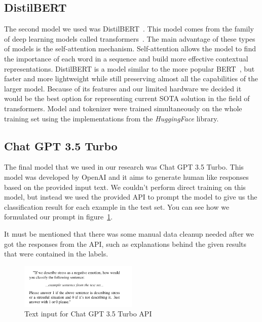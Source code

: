 \documentclass[10pt, a4paper]{article}
\begin{document}
\subsection{DistilBERT}
The second model we used was DistilBERT~\citep{sanh2020distilbert}.
This model comes from the family of deep learning models called transformers~\citep{vaswani2017attention}.
The main advantage of these types of models is the self-attention mechanism.
Self-attention allows the model to find the importance of each word in a sequence and build more effective contextual representations.
\hfill \break
\hfill \break
DistilBERT is a model similar to the more popular BERT~\citep{devlin2019bert}, but faster and more lightweight while still preserving almost all the capabilities of the larger model.
Because of its features and our limited hardware we decided it would be the best option for representing current SOTA solution in the field of transformers.
Model and tokenizer were trained simultaneously on the whole training set using the implementations from the \textit{HuggingFace} library.





\subsection{Chat GPT 3.5 Turbo}
The final model that we used in our research was Chat GPT 3.5 Turbo.
This model was developed by OpenAI and it aims to generate human like responses based on the provided input text.
We couldn't perform direct training on this model, but instead we used the provided API to prompt the model to give us the classification result for each example in the test set.
You can see how we formulated our prompt in figure~\ref{fig:chat-gpt-prompt}.

It must be mentioned that there was some manual data cleanup needed after we got the responses from the API, such as explanations behind the given results that were contained in the labels.

\begin{figure}
    \centering
    \includegraphics[width=0.5\textwidth]{images/chat-gpt-prompt}
    \caption{Text input for Chat GPT 3.5 Turbo API}
    \label{fig:chat-gpt-prompt}
\end{figure}
\end{document}

